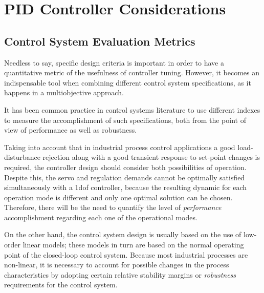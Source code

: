 \chapter{PID Controller Considerations}
\label{chap:PIDControllerConsideration}

\section{Control System Evaluation Metrics}
%
Needless to say, specific design criteria is important in order to have a quantitative metric of the usefulness of controller tuning. However, it becomes an indispensable tool when combining different control system specifications, as it happens in a multiobjective approach.

It has been common practice in control systems literature to use different indexes to measure the accomplishment of such specifications, both from the point of view of performance as well as robustness.

Taking into account that in industrial process control applications a good load-disturbance rejection along with a good transient response to set-point changes is required, the controller design should consider both possibilities of operation. Despite this, the servo and regulation demands cannot be optimally satisfied simultaneously with a \gls{1dof} controller, because the resulting dynamic for each operation mode is different and only one optimal solution can be chosen. Therefore, there will be the need to quantify the level of \emph{performance} accomplishment regarding each one of the operational modes.

On the other hand, the control system design is usually based on the use of low-order linear models; these models in turn are based on the normal operating point of the closed-loop control system. Because most industrial processes are non-linear, it is necessary to account for possible changes in the process characteristics by adopting certain relative stability margins or \emph{robustness} requirements for the control system.

